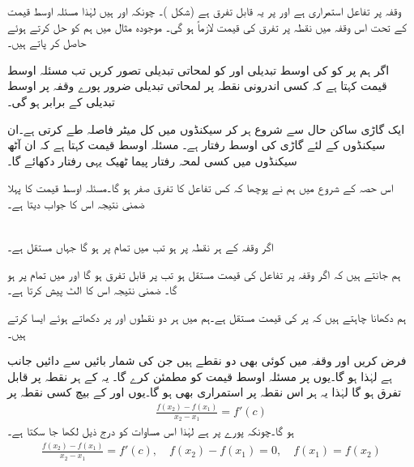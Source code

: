 وقفہ  پر تفاعل  استمراری ہے اور  پر یہ قابل تفرق ہے (شکل )۔ چونکہ  اور  ہیں لہٰذا مسئلہ اوسط قیمت کے تحت اس وقفہ میں نقطہ  پر تفرق  کی قیمت لازماً  ہو گی۔ موجودہ مثال میں ہم  کو حل کرتے ہوئے
  حاصل کر پاتے ہیں۔ 

اگر ہم  پر  کو  کی  اوسط تبدیلی اور  کو لمحاتی تبدیلی تصور کریں تب مسئلہ اوسط قیمت کہتا ہے کہ کسی اندرونی   نقطہ پر لمحاتی تبدیلی ضرور پورے وقفہ پر اوسط تبدیلی کے برابر ہو گی۔

ایک گاڑی ساکن حال سے شروع ہر کر  سیکنڈوں میں کل  میٹر فاصلہ طے کرتی ہے۔ان  سیکنڈوں کے لئے گاڑی کی اوسط رفتار  ہے۔ مسئلہ اوسط قیمت کہتا ہے کہ ان آٹھ سیکنڈوں میں کسی لمحہ رفتار پیما ٹھیک یہی رفتار دکھائے گا۔


اس حصہ کے شروع میں ہم نے پوچھا کہ کس تفاعل کا تفرق صفر ہو گا۔مسئلہ اوسط قیمت کا پہلا ضمنی نتیجہ اس کا جواب دیتا ہے۔

\\
اگر وقفہ  کے ہر نقطہ پر  ہو تب  میں تمام  پر  ہو گا جہاں  مستقل ہے۔

ہم جانتے ہیں کہ اگر وقفہ  پر تفاعل  کی قیمت مستقل ہو تب  پر  قابل تفرق ہو گا اور  میں تمام  پر  ہو گا۔ ضمنی نتیجہ اس کا الٹ پیش کرتا ہے۔

ہم دکھانا چاہتے ہیں کہ  پر  کی قیمت مستقل ہے۔ہم  میں ہر دو نقطوں  اور  پر  دکھاتے ہوئے ایسا کرتے ہیں۔

فرض کریں  اور  وقفہ  میں کوئی بھی دو نقطے ہیں جن کی شمار بائیں سے دائیں جانب ہے لہٰذا  ہو گا۔یوں  پر  مسئلہ اوسط قیمت کو مطمئن کرے گا۔ یہ  کے ہر نقطہ پر قابل تفرق ہو گا لہٰذا یہ ہر اس نقطہ پر استمراری بھی ہو گا۔یوں  اور  کے بیچ کسی نقطہ  پر
\begin{align*}
\frac{f(x_2)-f(x_1)}{x_2-x_1}=f'(c)
\end{align*}
ہو گا۔چونکہ پورے  پر  ہے لہٰذا اس مساوات کو درج ذیل لکھا جا سکتا ہے۔
\begin{align*}
\frac{f(x_2)-f(x_1)}{x_2-x_1}=f'(c),\quad f(x_2)-f(x_1)=0,\quad f(x_1)=f(x_2)
\end{align*}

